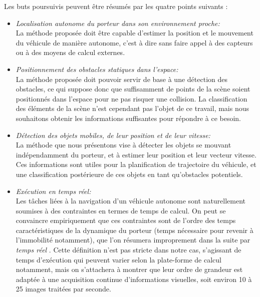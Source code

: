 Les buts poursuivis peuvent être résumés par les quatre points suivants :
\begin{itemize}
	\item{\emph{Localisation autonome du porteur dans son environnement proche:}\\}
	La méthode proposée doit être capable d'estimer la position et le mouvement du véhicule de manière autonome, c'est à dire sans faire appel à des capteurs ou à des moyens de calcul externes.\\
	
	\item{\emph{Positionnement des obstacles statiques dans l'espace:}\\}
	La méthode proposée doit pouvoir servir de base à une détection des obstacles, ce qui suppose donc que suffisamment de points de la scène soient positionnés dans l'espace pour ne pas risquer une collision. La classification des éléments de la scène n'est cependant pas l'objet de ce travail, mais nous souhaitons obtenir les informations suffisantes pour répondre à ce besoin.\\
	
	\item {\emph{Détection des objets mobiles, de leur position et de leur vitesse:\\}}
	La méthode que nous présentons vise à détecter les objets se mouvant indépendamment du porteur, et à estimer leur position et leur vecteur vitesse. Ces informations sont utiles pour la planification de trajectoire du véhicule, et une classification postérieure de ces objets en tant qu'obstacles potentiels.\\
	
	\item{\emph{Exécution en temps réel:}\\}
	Les tâches liées à la navigation d'un véhicule autonome sont naturellement soumises à des contraintes en termes de temps de calcul. On peut se convaincre empiriquement que ces contraintes sont de l'ordre des temps caractéristiques de la dynamique du porteur (temps nécessaire pour revenir à l'immobilité notamment), que l'on résumera improprement dans la suite par \og \textit{temps réel} \fg. Cette définition n'est pas stricte dans notre cas, s'agissant de temps d'exécution qui peuvent varier selon la plate-forme de calcul notamment, mais on s'attachera à montrer que leur ordre de grandeur est adaptée à une acquisition continue d'informations visuelles, soit environ 10 à 25 images traitées par seconde.\\
\end{itemize}

